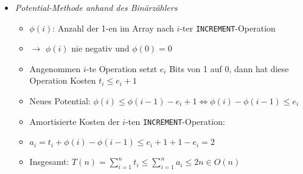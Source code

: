 \begin{itemize}
\begin{itemize}
                \item \textit{Potential-Methode anhand des Binärzählers}
                    \begin{itemize}
                        \item $\phi(i)$: Anzahl der 1-en im Array nach $i$-ter \texttt{INCREMENT}-Operation
                        \item[] $\rightarrow$ $\phi(i)$ nie negativ und $\phi(0) = 0$
                        \item Angenommen $i$-te Operation setzt $e_i$ Bits von 1 auf 0, dann hat diese Operation Kosten $t_i \leq e_i + 1$
                        \item Neues Potential: $\phi(i) \leq \phi(i-1) - e_i + 1 \Leftrightarrow \phi(i) - \phi(i-1) \leq e_i$
                        \item Amortisierte Kosten der $i$-ten \texttt{INCREMENT}-Operation:
                        \item[] $a_i = t_i + \phi(i) - \phi(i-1) \leq e_i + 1 + 1 - e_i = 2$
                        \item Insgesamt: $T(n) = \sum^n_{i=1} t_i \leq \sum^n_{i=1} a_i \leq 2n \in O(n)$ 
                    \end{itemize}
            \end{itemize}
    \end{itemize}

\pagebreak

